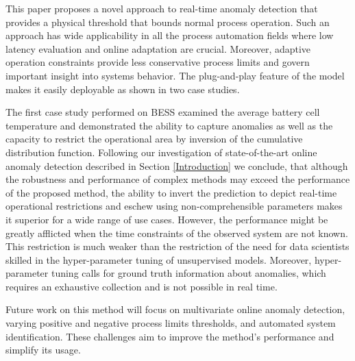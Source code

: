 This paper proposes a novel approach to real-time anomaly detection that provides a physical threshold that bounds normal process operation. Such an approach has wide applicability in all the process automation fields where low latency evaluation and online adaptation are crucial. Moreover, adaptive operation constraints provide less conservative process limits and govern important insight into systems behavior. The plug-and-play feature of the model makes it easily deployable as shown in two case studies. 

The first case study performed on BESS examined the average battery cell temperature and demonstrated the ability to capture anomalies as well as the capacity to restrict the operational area by inversion of the cumulative distribution function. Following our investigation of state-of-the-art online anomaly detection described in Section \ref{Introduction} we conclude, that although the robustness and performance of complex methods may exceed the performance of the proposed method, the ability to invert the prediction to depict real-time operational restrictions and eschew using non-comprehensible parameters makes it superior for a wide range of use cases. However, the performance might be greatly afflicted when the time constraints of the observed system are not known. This restriction is much weaker than the restriction of the need for data scientists skilled in the hyper-parameter tuning of unsupervised models. Moreover, hyper-parameter tuning calls for ground truth information about anomalies, which requires an exhaustive collection and is not possible in real time. 

Future work on this method will focus on multivariate online anomaly detection, varying positive and negative process limits thresholds, and automated system identification. These challenges aim to improve the method's performance and simplify its usage.


